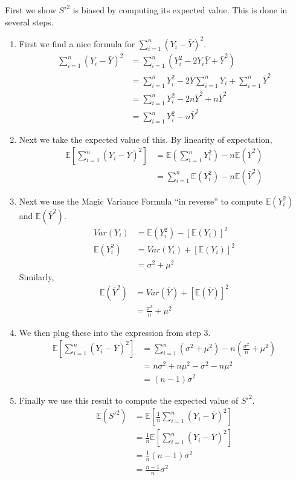 \documentclass[12pt]{article}
\theoremstyle{definition}
\theoremstyle{remark}
\def\E{{\mathbb E}}
\begin{document}
First we show $S'^2$ is biased by computing its expected value. This is done in several steps.
\begin{enumerate}
\item First we find a nice formula for $\sum_{i=1}^n (Y_i - \bar{Y})^2$.
\begin{align*}
\sum_{i=1}^n (Y_i - \bar{Y})^2 &= \sum_{i=1}^n (Y_i^2 - 2 Y_i \bar{Y} + \bar{Y}^2) \\
&= \sum_{i=1}^n Y_i^2 - 2 \bar{Y} \sum_{i=1}^n Y_i + \sum_{i=1}^n \bar{Y}^2 \\
&= \sum_{i=1}^n Y_i^2 - 2 n \bar{Y}^2 + n \bar{Y}^2 \\
&= \sum_{i=1}^n Y_i^2 - n \bar{Y}^2
\end{align*}
\item Next we take the expected value of this. By linearity of expectation,
\begin{align*}
\E\left[ \sum_{i=1}^n (Y_i - \bar{Y})^2 \right] &= \E\left( \sum_{i=1}^n Y_i^2 \right) - n \E(\bar{Y}^2) \\
&= \sum_{i=1}^n \E(Y_i^2) - n \E(\bar{Y}^2)
\end{align*}
\item Next we use the Magic Variance Formula ``in reverse'' to compute $\E(Y_i^2)$ and $\E(\bar{Y}^2)$.
\begin{align*}
Var(Y_i) &= \E(Y_i^2) - [\E(Y_i)]^2 \\
\E(Y_i^2) &= Var(Y_i) + [\E(Y_i)]^2 \\
&= \sigma^2 + \mu^2
\end{align*}
Similarly,
\begin{align*}
\E(\bar{Y}^2) &= Var(\bar{Y}) + [\E(\bar{Y})]^2 \\
&= \frac{\sigma^2}{n} + \mu^2
\end{align*}
\item We then plug these into the expression from step 3.
\begin{align*}
\E\left[ \sum_{i=1}^n (Y_i - \bar{Y})^2 \right] &= \sum_{i=1}^n (\sigma^2 + \mu^2) - n \left(\frac{\sigma^2}{n} + \mu^2\right) \\
&= n\sigma^2 + n\mu^2 - \sigma^2 - n\mu^2 \\
&= (n-1)\sigma^2
\end{align*}
\item Finally we use this result to compute the expected value of $S'^2$.
\begin{align*}
\E(S'^2) &= \E \left[ \frac{1}{n} \sum_{i=1}^n (Y_i - \bar{Y})^2 \right]\\
&= \frac{1}{n} \E  \left[ \sum_{i=1}^n (Y_i - \bar{Y})^2 \right] \\
&= \frac{1}{n} (n-1)\sigma^2 \\
&= \frac{n-1}{n} \sigma^2
\end{align*}
\end{enumerate}
\end{document}
